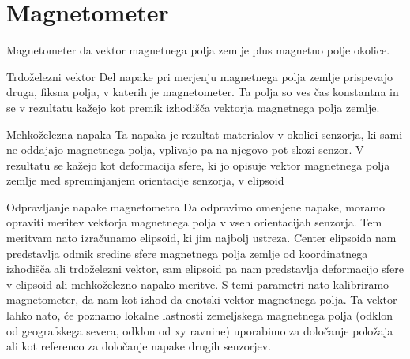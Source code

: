 \documentclass[]{article}
\begin{document}
\section{Magnetometer}
Magnetometer da vektor magnetnega polja zemlje plus magnetno polje okolice.
\begin {subsection}{Trdoželezni vektor}
Del napake pri merjenju magnetnega polja zemlje prispevajo druga, fiksna polja, v katerih je magnetometer. Ta polja so ves čas konstantna in se v rezultatu kažejo kot premik izhodišča vektorja magnetnega polja zemlje.
\begin {subsection}{Mehkoželezna napaka}
Ta napaka je rezultat materialov v okolici senzorja, ki sami ne oddajajo magnetnega polja, vplivajo pa na njegovo pot skozi senzor. V rezultatu se kažejo kot deformacija sfere, ki jo opisuje vektor magnetnega polja zemlje med spreminjanjem orientacije senzorja, v elipsoid
\begin {subsection}{Odpravljanje napake magnetometra}
Da odpravimo omenjene napake, moramo opraviti meritev vektorja magnetnega polja v vseh orientacijah senzorja. Tem meritvam nato izračunamo elipsoid, ki jim najbolj ustreza. Center elipsoida nam predstavlja odmik sredine sfere magnetnega polja zemlje od koordinatnega izhodišča ali trdoželezni vektor, sam elipsoid pa nam predstavlja deformacijo sfere v elipsoid ali mehkoželezno napako meritve. S temi parametri nato kalibriramo magnetometer, da nam kot izhod da enotski vektor magnetnega polja. Ta vektor lahko nato, če poznamo lokalne lastnosti zemeljskega magnetnega polja (odklon od geografskega severa, odklon od xy ravnine) uporabimo za določanje položaja ali kot referenco za določanje napake drugih senzorjev.
\end {subsection}
\end {subsection}
\end {subsection}
\end{document}
